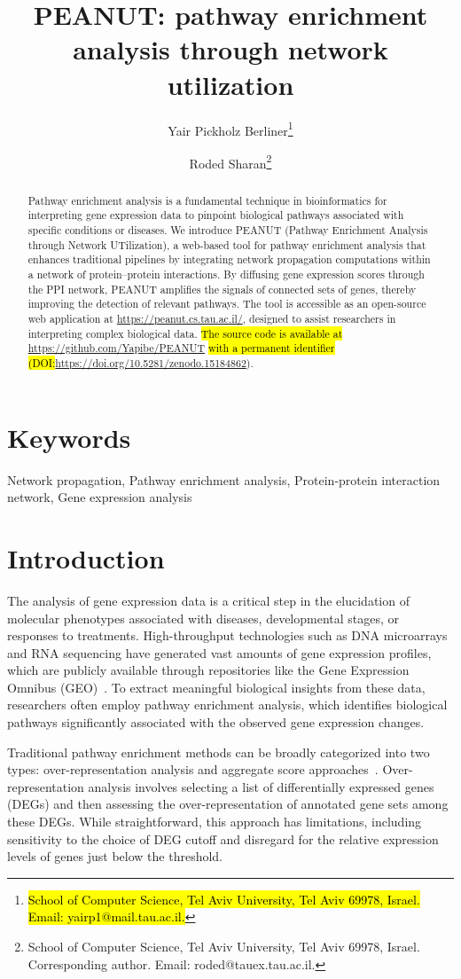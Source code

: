 \documentclass{article}
\title{PEANUT: pathway enrichment analysis through network utilization}
\author{
    Yair Pickholz Berliner\thanks{\hl{School of Computer Science, Tel Aviv University, Tel Aviv 69978, Israel. Email: yairp1@mail.tau.ac.il.}} \and 
    Roded Sharan\thanks{School of Computer Science, Tel Aviv University, Tel Aviv 69978, Israel. Corresponding author. Email: roded@tauex.tau.ac.il.}
}
\date{}
\begin{document}
\maketitle
\begin{abstract}
Pathway enrichment analysis is a fundamental technique in bioinformatics for interpreting gene expression data to pinpoint biological pathways associated with specific conditions or diseases. We introduce PEANUT (Pathway Enrichment Analysis through Network UTilization), a web-based tool for pathway enrichment analysis that enhances traditional pipelines by integrating network propagation computations within a network of protein--protein interactions. By diffusing gene expression scores through the PPI network, PEANUT amplifies the signals of connected sets of genes, thereby improving the detection of relevant pathways.
The tool is accessible as an open-source web application at \url{https://peanut.cs.tau.ac.il/}, 
designed to assist researchers in interpreting complex biological data. \hl{The source code is available at} \url{https://github.com/Yapibe/PEANUT} \hl{with a permanent identifier (DOI:}\url{https://doi.org/10.5281/zenodo.15184862}).
\end{abstract}

\section*{Keywords}
Network propagation, Pathway enrichment analysis, 
Protein-protein interaction network, Gene expression analysis

\section{Introduction}
The analysis of gene expression data is a critical step in the elucidation of molecular phenotypes associated with diseases, developmental stages, or responses to treatments. High-throughput technologies such as DNA microarrays and RNA sequencing have generated vast amounts of gene expression profiles, which are publicly available through repositories like the Gene Expression Omnibus (GEO)~\cite{Barrett2013}. To extract meaningful biological insights from these data, researchers often employ pathway enrichment analysis, which identifies biological pathways significantly associated with the observed gene expression changes.

Traditional pathway enrichment methods can be broadly categorized into two types: over-representation analysis and aggregate score approaches~\cite{Irizarry2009}. Over-representation analysis involves selecting a list of differentially expressed genes (DEGs) and then assessing the over-representation of annotated gene sets among these DEGs. While straightforward, this approach has limitations, including sensitivity to the choice of DEG cutoff and disregard for the relative expression levels of genes just below the threshold.
\end{document}
